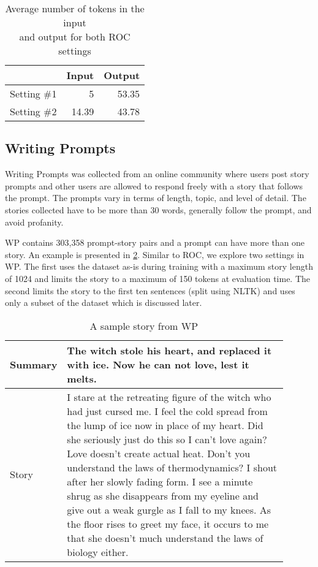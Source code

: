 \begin{table}[ht]
\centering
\begin{tabular}{l|rr}

            & Input & Output \\ \hline
Setting \#1 & 5     & 53.35  \\
Setting \#2 & 14.39 & 43.78 \\
\end{tabular}
\caption{Average number of tokens in the input \\ and output for both ROC settings}
\label{tab:roc-statistics}
\end{table}


\subsection{Writing Prompts}
\label{sec:writing_prompts}

Writing Prompts \cite[WP]{fan2018hierarchical} was collected from an online community where users post story prompts and other users are allowed to respond freely with a story that follows the prompt. The prompts vary in terms of length, topic, and level of detail. The stories collected have to be more than 30 words, generally follow the prompt, and avoid profanity.

WP contains 303,358 prompt-story pairs and a prompt can have more than one story. An example is presented in \cref{tab:wp-samples}. Similar to ROC, we explore two settings in WP. The first uses the dataset as-is during training with a maximum story length of 1024 and limits the story to a maximum of 150 tokens at evaluation time. The second limits the story to the first ten sentences (split using NLTK) and uses only a subset of the dataset which is discussed later.


\begin{table}[ht]
\centering
\begin{tabular}{p{0.1\linewidth} | p{0.8\linewidth}}
Summary  & The witch stole his heart, and replaced it with ice. Now he can not love, lest it melts. \\ \hline
Story &
I stare at the retreating figure of the witch who had just cursed me. I feel the cold spread from the lump of ice now in place of my heart. Did she seriously just do this so I can't love again? Love doesn't create actual heat. Don't you understand the laws of thermodynamics? I shout after her slowly fading form. I see a minute shrug as she disappears from my eyeline and give out a weak gurgle as I fall to my knees. As the floor rises to greet my face, it occurs to me that she doesn't much understand the laws of biology either. \\
\end{tabular}
\caption{A sample story from WP}
\label{tab:wp-samples}
\end{table}

